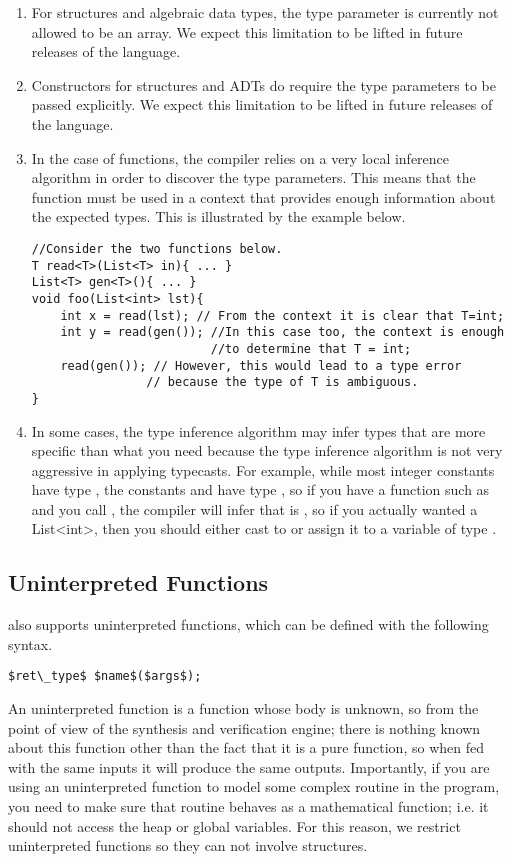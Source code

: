 \begin{enumerate}
\item For structures and algebraic data types, the type parameter is currently
not allowed to be an array. We expect this limitation to be lifted in
future releases of the language.
\item Constructors for structures and ADTs do require the type
parameters to be passed explicitly. We expect this limitation to be lifted
in future releases of the language.
\item In the case of functions, the compiler relies on a very local inference
algorithm in order to discover the type parameters. This means that the
function must be used in a context that provides enough information
about the expected types. This is illustrated by the example below.
\begin{lstlisting}
//Consider the two functions below.
T read<T>(List<T> in){ ... }
List<T> gen<T>(){ ... }
void foo(List<int> lst){
    int x = read(lst); // From the context it is clear that T=int;
    int y = read(gen()); //In this case too, the context is enough
                         //to determine that T = int;
    read(gen()); // However, this would lead to a type error
                // because the type of T is ambiguous.
}
\end{lstlisting}
\item In some cases, the type inference algorithm may infer types that
are more specific than what you need because the type inference
algorithm is not very aggressive in applying typecasts.
For example, while most integer
constants have type , the constants  and  have
type , so if you have a function such as
 and you call , the compiler will
infer that  is , so if you actually wanted a List<int>, then
you should either cast  to  or assign it to a variable of
type .
\end{enumerate}



\subsection{Uninterpreted Functions}
\Sk{} also supports uninterpreted functions, which can be defined with the following syntax.
\begin{lstlisting}
$ret\_type$ $name$($args$);
\end{lstlisting}
An uninterpreted function is a function whose body is unknown, so from the point of view of the synthesis and verification engine; there is nothing known about this function other than the fact that it is a pure function, so when fed with the same inputs it will produce the same outputs. Importantly, if you are using an uninterpreted function to model some complex routine in the program, you need to make sure that routine behaves as a mathematical function; i.e. it should not access the heap or global variables. For this reason, we restrict uninterpreted functions so they can not involve structures.


